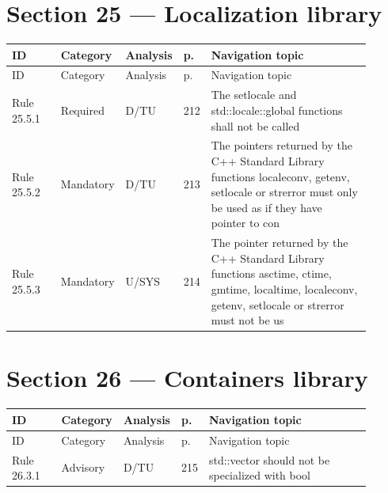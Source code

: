 \documentclass[10pt,letterpaper]{article}
\begin{document}
\section{Section 25 --- Localization library}
\small\setlength{\tabcolsep}{3pt}\renewcommand{\arraystretch}{1.15}
\begin{longtable}{p{0.14\linewidth}p{0.14\linewidth}p{0.1\linewidth}p{0.045\linewidth}p{0.475\linewidth}}
\toprule
ID & Category & Analysis & p. & Navigation topic\\ \midrule
\endfirsthead
\toprule
ID & Category & Analysis & p. & Navigation topic\\ \midrule
\endhead
Rule 25.5.1 & Required & D/TU & 212 & The setlocale and std::locale::global functions shall not be called\\
Rule 25.5.2 & Mandatory & D/TU & 213 & The pointers returned by the C++ Standard Library functions localeconv, getenv, setlocale or strerror must only be used as if they have pointer to con\\
Rule 25.5.3 & Mandatory & U/SYS & 214 & The pointer returned by the C++ Standard Library functions asctime, ctime, gmtime, localtime, localeconv, getenv, setlocale or strerror must not be us\\
\bottomrule
\end{longtable}
\normalsize

\section{Section 26 --- Containers library}
\small\setlength{\tabcolsep}{3pt}\renewcommand{\arraystretch}{1.15}
\begin{longtable}{p{0.14\linewidth}p{0.14\linewidth}p{0.1\linewidth}p{0.045\linewidth}p{0.475\linewidth}}
\toprule
ID & Category & Analysis & p. & Navigation topic\\ \midrule
\endfirsthead
\toprule
ID & Category & Analysis & p. & Navigation topic\\ \midrule
\endhead
Rule 26.3.1 & Advisory & D/TU & 215 & std::vector should not be specialized with bool\\
\bottomrule
\end{longtable}
\normalsize
\end{document}
